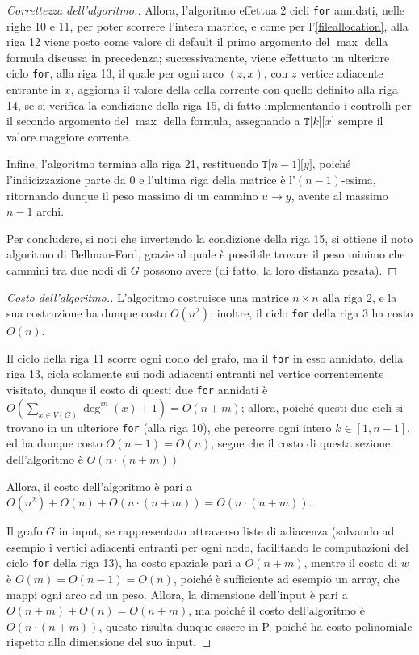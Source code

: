 \documentclass[a4paper, 12pt]{report}
\begin{document}
\begin{proof}[Correttezza dell'algoritmo.]
        Allora, l'algoritmo effettua 2 cicli \texttt{for} annidati, nelle righe 10 e 11, per poter scorrere l'intera matrice, e come per l'\cref{fileallocation}, alla riga 12 viene posto come valore di default il primo argomento del $\max$ della formula discussa in precedenza; successivamente, viene effettuato un ulteriore ciclo \texttt{for}, alla riga 13, il quale per ogni arco $(z, x)$, con $z$ vertice adiacente entrante in $x$, aggiorna il valore della cella corrente con quello definito alla riga 14, se si verifica la condizione della riga 15, di fatto implementando i controlli per il secondo argomento del $\max$ della formula, assegnando a $\texttt{T[}k\texttt{][}x\texttt{]}$ sempre il valore maggiore corrente.

        Infine, l'algoritmo termina alla riga 21, restituendo $\texttt{T[}n - 1\texttt{][}y\texttt{]}$, poiché l'indicizzazione parte da $0$ e l'ultima riga della matrice è l'$(n - 1)$-esima, ritornando dunque il peso massimo di un cammino $u \rightarrow y$, avente al massimo $n - 1$ archi.

        Per concludere, si noti che invertendo la condizione della riga 15, si ottiene il noto algoritmo di Bellman-Ford, grazie al quale è possibile trovare il peso minimo che cammini tra due nodi di $G$ possono avere (di fatto, la loro distanza pesata).
    \end{proof}

    \begin{proof}[Costo dell'algoritmo.]
        L'algoritmo costruisce una matrice $n \times n$ alla riga 2, e la sua costruzione ha dunque costo $O(n^2)$; inoltre, il ciclo \texttt{for} della riga 3 ha costo $O(n)$.

        Il ciclo della riga 11 scorre ogni nodo del grafo, ma il \texttt{for} in esso annidato, della riga 13, cicla solamente sui nodi adiacenti entranti nel vertice correntemente visitato, dunque il costo di questi due \texttt{for} annidati è $\displaystyle O\left(\sum_{x \in V(G)}{\deg^{in}(x) + 1} \right) = O(n + m)$; allora, poiché questi due cicli si trovano in un ulteriore \texttt{for} (alla riga 10), che percorre ogni intero $k \in [1, n- 1]$, ed ha dunque costo $O(n - 1) = O(n)$, segue che il costo di questa sezione dell'algoritmo è $O(n \cdot (n + m))$

        Allora, il costo dell'algoritmo è pari a $O(n ^2) + O(n) + O(n \cdot(n + m)) = O(n \cdot (n + m))$.

        Il grafo $G$ in input, se rappresentato attraverso liste di adiacenza (salvando ad esempio i vertici adiacenti entranti per ogni nodo, facilitando le computazioni del ciclo \texttt{for} della riga 13), ha costo spaziale pari a $O(n + m)$, mentre il costo di $w$ è $O(m) = O(n - 1) = O(n)$, poiché è sufficiente ad esempio un array, che mappi ogni arco ad un peso. Allora, la dimensione dell'input è pari a $O(n + m) + O(n) = O(n + m)$, ma poiché il costo dell'algoritmo è $O(n \cdot (n + m))$, questo risulta dunque essere in P, poiché ha costo polinomiale rispetto alla dimensione del suo input.
    \end{proof}
\end{document}
